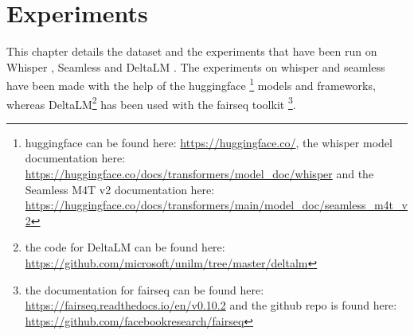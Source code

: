 
\chapter{Experiments}
\label{ch:experiment}
This chapter details the dataset and the experiments that have been run on Whisper \cite{radford2022robust}, Seamless \cite{seamless2023} and DeltaLM \cite{ma2021deltalm}.
The experiments on whisper and seamless have been made with the help of the huggingface \cite{huggingfaceseamless}\cite{huggingfacewhisper}\footnote{huggingface can be found here: \url{https://huggingface.co/}, the whisper model documentation here: \url{https://huggingface.co/docs/transformers/model_doc/whisper} and the Seamless M4T v2 documentation here: \url{https://huggingface.co/docs/transformers/main/model_doc/seamless_m4t_v2}} models and frameworks, whereas DeltaLM\footnote{the code for DeltaLM can be found here: \url{https://github.com/microsoft/unilm/tree/master/deltalm}} has been used with the fairseq toolkit \cite{ott2019fairseqfastextensibletoolkit}\footnote{the documentation for fairseq can be found here: \url{https://fairseq.readthedocs.io/en/v0.10.2} and the github repo is found here: \url{https://github.com/facebookresearch/fairseq}}.

